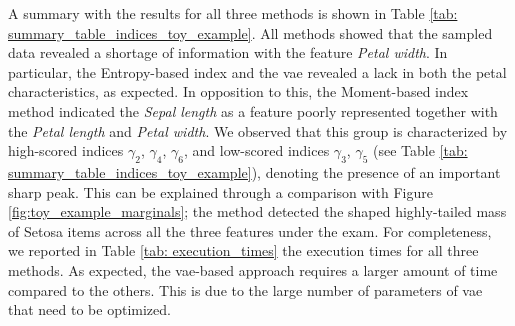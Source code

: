 A summary with the results for all three methods is shown in Table \ref{tab: summary_table_indices_toy_example}.
All methods showed that the sampled data revealed a shortage of information with the feature \emph{Petal width}.
In particular, the Entropy-based index and the \gls{vae} revealed a lack in both the petal characteristics, as expected.
In opposition to this, the Moment-based index method indicated the \emph{Sepal length} as a feature poorly represented together with the \emph{Petal length} and \emph{Petal width}.
We observed that this group is characterized by high-scored indices $\gamma_2$, $\gamma_4$, $\gamma_6$, and low-scored indices $\gamma_3$, $\gamma_5$ (see Table \ref{tab: summary_table_indices_toy_example}), denoting the presence of an important sharp peak.
This can be explained through a comparison with Figure \ref{fig:toy_example_marginals}; the method detected the shaped highly-tailed mass of Setosa items across all the three features under the exam.
For completeness, we reported in Table \ref{tab: execution_times} the execution times for all three methods.
As expected, the \gls{vae}-based approach requires a larger amount of time compared to the others.
This is due to the large
number of parameters of \gls{vae} that need to be optimized.

